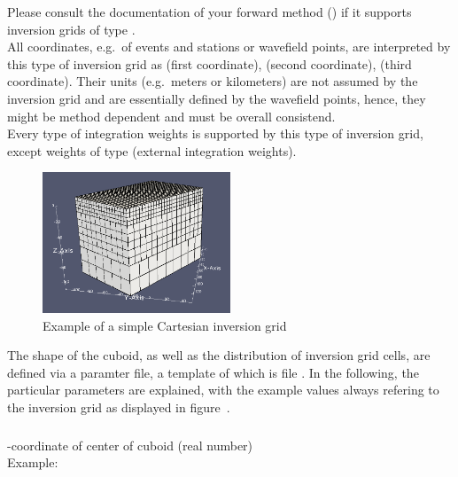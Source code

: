 Please consult the documentation of your forward method () if it supports
inversion grids of type . \\
All coordinates, e.g.\ of events and stations or wavefield points, are interpreted by this type of inversion grid as
 (first coordinate),  (second coordinate),  (third coordinate). Their
units (e.g.\ meters or kilometers) are not assumed by the inversion grid and are essentially defined by the wavefield
points, hence, they might be method dependent and must be overall consistend.\\
Every type of integration weights is supported by this type of inversion grid, except weights of type 
 (external integration weights).

\begin{figure}[ht]
  \centering
  \includegraphics[width=0.5\textwidth]{images/scartInversionGrid_manual.png}
  \caption{Example of a simple Cartesian inversion grid}
  \label{basic_steps,sec:invgrid,sub:scart,fig:grid}
\end{figure}

The shape of the cuboid, as well as the distribution of inversion grid cells, are defined 
via a paramter file, a template of which is file .
In the following, the particular parameters are explained, with the example
values always refering to the inversion grid as displayed in figure~.

\subsubsection{}
-coordinate of center of cuboid (real number)\\
Example:\\
